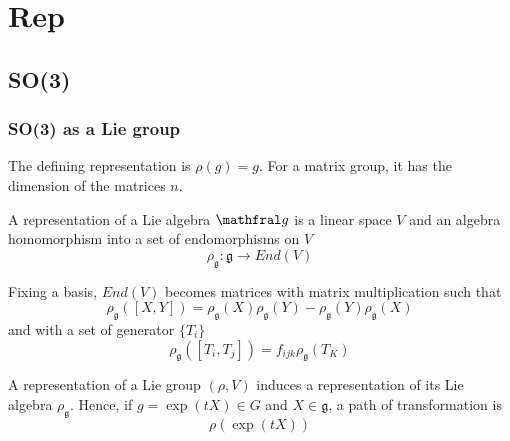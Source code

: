 \part{Rep}

\chapter{SO(3)}

\section{SO(3) as a Lie group}

    The defining representation is $\rho(g) = g$. For a matrix group, it has the dimension of the matrices $n$. 

    A representation of a Lie algebra $\mathfral g$ is a linear space $V$ and an algebra homomorphism into a set of endomorphisms on $V$
    \begin{equation*}
        \rho_{\mathfrak g} \colon \mathfrak g \rightarrow End(V)
    \end{equation*}

    Fixing a basis, $End(V)$ becomes matrices with matrix multiplication such that 
    \begin{equation*}
        \rho_{\mathfrak g} ([X, Y]) = \rho_{\mathfrak g}(X) \rho_{\mathfrak g}(Y) - \rho_{\mathfrak g}(Y) \rho_{\mathfrak g}(X)
    \end{equation*}
    and with a set of generator $\{T_i\}$ 
    \begin{equation*}
        \rho_{\mathfrak g}([T_i, T_j])= f_{ijk} \rho_{\mathfrak g} (T_K)
    \end{equation*}

    A representation of a Lie group $(\rho, V)$ induces a representation of its Lie algebra $\rho_{\mathfrak g}$. Hence, if $g = \exp (tX) \in G$ and $X \in \mathfrak g$, a path of transformation is
    \begin{equation*}
        \rho(\exp(tX))
    \end{equation*}
    